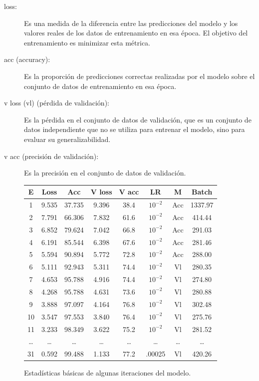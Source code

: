     \begin{description}
        \item [loss:] Es una medida de la diferencia entre las predicciones del modelo y los valores reales de los datos de entrenamiento en esa época. El objetivo del entrenamiento es minimizar esta métrica.
        \item [acc (accuracy):] Es la proporción de predicciones correctas realizadas por el modelo sobre el conjunto de datos de entrenamiento en esa época.
        \item [v loss (vl) (pérdida de validación):] Es la pérdida en el conjunto de datos de validación, que es un conjunto de datos independiente que no se utiliza para entrenar el modelo, sino para evaluar su generalizabilidad.
        \item [v acc (precisión de validación):] Es la precisión en el conjunto de datos de validación.
    \end{description}
\begin{figure}[ht]
        \small
        \begin{center}
            \begin{tabular}{|c|c|c|c|c|c|c|c|} \hline
            E  & Loss  & Acc & V loss & V acc & LR             & M & Batch \\ \hline
            1  & 9.535 & 37.735   & 9.396  & 38.4  & $10^{-2}$ & Acc     & 1337.97 \\ \hline
            2  & 7.791 & 66.306   & 7.832  & 61.6  & $10^{-2}$ & Acc     & 414.44 \\ \hline
            3  & 6.852 & 79.624   & 7.042  & 66.8  & $10^{-2}$ & Acc     & 291.03 \\ \hline
            4  & 6.191 & 85.544   & 6.398  & 67.6  & $10^{-2}$ & Acc     & 281.46 \\ \hline
            5  & 5.594 & 90.894   & 5.772  & 72.8  & $10^{-2}$ & Acc     & 288.00 \\ \hline
            6  & 5.111 & 92.943   & 5.311  & 74.4  & $10^{-2}$ & Vl  & 280.35 \\ \hline
            7  & 4.653 & 95.788   & 4.916  & 74.4  & $10^{-2}$ & Vl  & 274.80 \\ \hline
            8  & 4.268 & 95.788   & 4.631  & 73.6  & $10^{-2}$ & Vl  & 280.88 \\ \hline
            9  & 3.888 & 97.097   & 4.164  & 76.8  & $10^{-2}$ & Vl  & 302.48 \\ \hline
            10 & 3.547 & 97.553   & 3.840  & 76.4  & $10^{-2}$ & Vl  & 275.76 \\ \hline
            11 & 3.233 & 98.349   & 3.622  & 75.2  & $10^{-2}$ & Vl  & 281.52 \\ \hline
            \dots   & \dots   & \dots      & \dots    & \dots   & \dots    & \dots     & \dots \\ \hline
            31 & 0.592 & 99.488   & 1.133  & 77.2  & .00025 & Vl  & 420.26 \\ \hline
            \end{tabular}
            \caption{Estadísticas básicas de algunas iteraciones del modelo.}
        \end{center}\label{fig:modelo}
    \end{figure}
    
